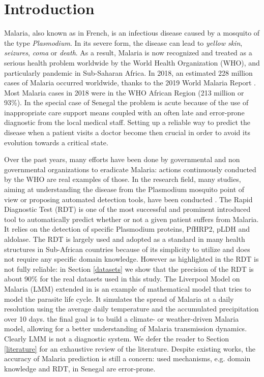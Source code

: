 \section{Introduction}\label{Introduction}
Malaria, also known as \emph{} in French, is an infectious disease caused by a mosquito of the type \emph{Plasmodium}. 
In its severe form, the disease can lead to \emph{yellow skin}, \emph{seizures}, \emph{coma} or \emph{death}. 
As a result, Malaria is now recognized  and treated as a serious health problem worldwide by the World Health Organization (WHO), and particularly pandemic in Sub-Saharan Africa. 
In 2018, an estimated 228 million cases of Malaria occurred worldwide, thanks to the  2019 World Malaria Report \cite{19WMR}. Most Malaria cases in 2018 were in the WHO African Region (213 million or 93\%). In the special case of Senegal the problem is acute because of the use of inappropriate care support means coupled with an often late and error-prone diagnostic from the local medical staff. Setting up a reliable way to predict the disease when a patient visits a doctor become then crucial in order to avoid its evolution towards a critical state.

Over the past years, many efforts have been done by governmental and non governmental organizations  to eradicate Malaria:  actions continuously conducted by the WHO are real examples of those.  In the research field, many studies, aiming at understanding the disease from the Plasmodium mosquito point of view or proposing automated detection tools, have been conducted \cite{Le74, ermert2011development,Hu17, Ga19}. The Rapid Diagnostic Test (RDT) \cite{Hu17} is one of the most successful and prominent introduced tool to automatically predict whether or not a given patient suffers from Malaria. It relies on the
detection of specific Plasmodium proteins, PfHRP2, pLDH
and aldolase. The RDT is largely used and adopted as a standard in many health structures in Sub-African countries because of its simplicity to utilize and does not require any specific domain knowledge. However as highlighted in \cite{Hu17} the RDT is not fully reliable:  in Section \ref{datasets} we show that the precision of the RDT is about 90\% for the real datasets used in this study.
The Liverpool Model on Malaria (LMM) extended in \cite{ermert2011development} is an example of mathematical model that tries to model the parasite life cycle. It simulates the spread of Malaria at a daily resolution using the average daily temperature and the accumulated precipitation over 10 days. the final goal is to build a climate- or weather-driven Malaria model,  allowing for a better understanding of Malaria transmission dynamics. Clearly LMM is not a diagnostic system. We defer the reader to Section \ref{literature} for an exhaustive review of the literature. Despite existing works,  the accuracy of Malaria prediction is still a concern: used mechanisms, e.g. domain knowledge and RDT, in Senegal are error-prone.


